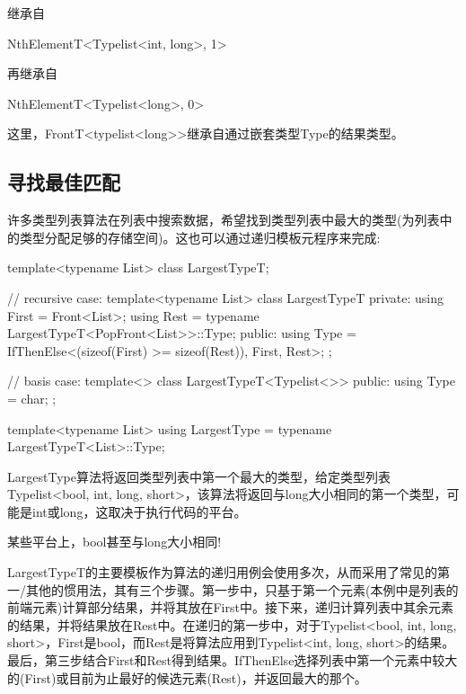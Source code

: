 继承自

\begin{cpp}
NthElementT<Typelist<int, long>, 1>
\end{cpp}

再继承自

\begin{cpp}
NthElementT<Typelist<long>, 0>
\end{cpp}

这里，FrontT<typelist<long>{}>继承自通过嵌套类型Type的结果类型。

\subsection{寻找最佳匹配}

许多类型列表算法在列表中搜索数据，希望找到类型列表中最大的类型(为列表中的类型分配足够的存储空间)。这也可以通过递归模板元程序来完成:

\begin{cpp}
template<typename List>
class LargestTypeT;

// recursive case:
template<typename List>
class LargestTypeT
{
	private:
	using First = Front<List>;
	using Rest = typename LargestTypeT<PopFront<List>>::Type;
	public:
	using Type = IfThenElse<(sizeof(First) >= sizeof(Rest)), First, Rest>;
};

// basis case:
template<>
class LargestTypeT<Typelist<>>
{
	public:
	using Type = char;
};

template<typename List>
using LargestType = typename LargestTypeT<List>::Type;
\end{cpp}

LargestType算法将返回类型列表中第一个最大的类型，给定类型列表Typelist<bool, int, long, short>，该算法将返回与long大小相同的第一个类型，可能是int或long，这取决于执行代码的平台。

\begin{notice}
某些平台上，bool甚至与long大小相同!
\end{notice}

LargestTypeT的主要模板作为算法的递归用例会使用多次，从而采用了常见的第一/其他的惯用法，其有三个步骤。第一步中，只基于第一个元素(本例中是列表的前端元素)计算部分结果，并将其放在First中。接下来，递归计算列表中其余元素的结果，并将结果放在Rest中。在递归的第一步中，对于Typelist<bool, int, long, short>，First是bool，而Rest是将算法应用到Typelist<int, long, short>的结果。最后，第三步结合First和Rest得到结果。IfThenElse选择列表中第一个元素中较大的(First)或目前为止最好的候选元素(Rest)，并返回最大的那个。


